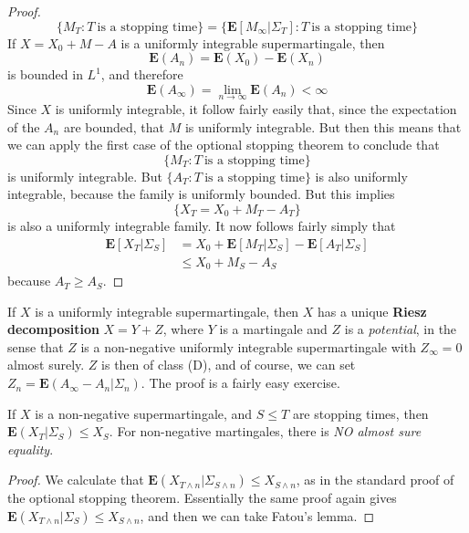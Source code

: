 \begin{proof}
    \[ \{ M_T: T\ \text{is a stopping time} \} = \{ \mathbf{E}[M_\infty|\Sigma_T]: T\ \text{is a stopping time} \} \]
    If $X = X_0 + M - A$ is a uniformly integrable supermartingale, then
    \[ \mathbf{E}(A_n) = \mathbf{E}(X_0) - \mathbf{E}(X_n) \]
    is bounded in $L^1$, and therefore
    \[ \mathbf{E}(A_\infty) = \lim_{n \to \infty} \mathbf{E}(A_n) < \infty \]
    Since $X$ is uniformly integrable, it follow fairly easily that, since the expectation of the $A_n$ are bounded, that $M$ is uniformly integrable. But then this means that we can apply the first case of the optional stopping theorem to conclude that
    \[ \{ M_T: T\ \text{is a stopping time} \} \]
    is uniformly integrable. But $\{ A_T: T\ \text{is a stopping time} \}$ is also uniformly integrable, because the family is uniformly bounded. But this implies
    \[ \{ X_T = X_0 + M_T - A_T \} \]
    is also a uniformly integrable family. It now follows fairly simply that
    \begin{align*}
        \mathbf{E}[X_T|\Sigma_S] &= X_0 + \mathbf{E}[M_T|\Sigma_S] - \mathbf{E}[A_T|\Sigma_S]\\
        &\leq X_0 + M_S - A_S
    \end{align*}
    because $A_T \geq A_S$.
\end{proof}

If $X$ is a uniformly integrable supermartingale, then $X$ has a unique {\bf Riesz decomposition} $X = Y + Z$, where $Y$ is a martingale and $Z$ is a {\it potential}, in the sense that $Z$ is a non-negative uniformly integrable supermartingale with $Z_\infty = 0$ almost surely. $Z$ is then of class (D), and of course, we can set $Z_n = \mathbf{E}(A_\infty - A_n|\Sigma_n)$. The proof is a fairly easy exercise.

\begin{theorem}
    If $X$ is a non-negative supermartingale, and $S \leq T$ are stopping times, then $\mathbf{E}(X_T|\Sigma_S) \leq X_S$. For non-negative martingales, there is {\it NO almost sure equality}.
\end{theorem}
\begin{proof}
    We calculate that $\mathbf{E}(X_{T \wedge n} | \Sigma_{S \wedge n}) \leq X_{S \wedge n}$, as in the standard proof of the optional stopping theorem. Essentially the same proof again gives $\mathbf{E}(X_{T \wedge n}|\Sigma_S) \leq X_{S \wedge n}$, and then we can take Fatou's lemma.
\end{proof}

